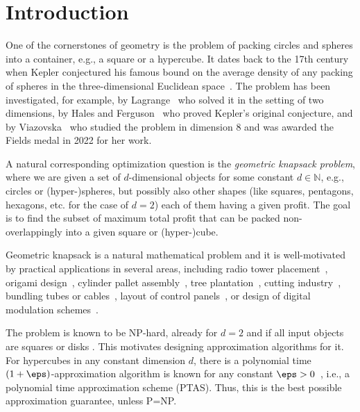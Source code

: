 

\section{Introduction}

\label{sec:intro} One of the cornerstones of geometry is the problem
of packing circles and spheres into a container, e.g., a square or
a hypercube. It dates back to the 17th century when Kepler conjectured
his famous bound on the average density of any packing of spheres
in the three-dimensional Euclidean space~\cite{kepler2010six}. The problem has been investigated, for example, by Lagrange~\cite{chang2010simple}
who solved it in the setting of two dimensions, by Hales and Ferguson~\cite{hales2006formulation}
who proved Kepler's original conjecture, and by Viazovska~\cite{viazovska2017sphere}
who studied the problem in dimension $8$ and was awarded the Fields
medal in 2022 for her work.

A natural corresponding optimization question is the \emph{geometric
knapsack problem}, where we are given a set of $d$-dimensional objects
for some constant $d\in\mathbb{N}$, e.g., circles or \mbox{(hyper-)}spheres,
but possibly also other shapes (like squares, pentagons, hexagons,
etc. for the case of $d=2$)  each of them having a given profit. The goal is to find the
subset of maximum total profit that can be packed non-overlappingly
into a given square or (hyper-)cube.  

Geometric knapsack is a natural mathematical problem and it is well-motivated
by practical applications in several areas, including radio tower
placement~\cite{szabo2007new}, origami design~\cite{lang1996computational},
cylinder pallet assembly~\cite{castillo2008solving,fraser1994integrated},
tree plantation~\cite{szabo2007new}, cutting industry~\cite{szabo2007new},
bundling tubes or cables~\cite{wang2002improved}, layout of control
panels~\cite{castillo2008solving}, or design of digital modulation
schemes~\cite{peikert1992packing}.

The problem is known to be \textsf{NP}-hard, already for $d=2$ and
if all input objects are  squares or disks \cite{demaine-Origami-NPHard,adamaszek2016hardness}.
This motivates designing approximation algorithms for it. For hypercubes
in any constant dimension $d$, there is a polynomial time $(1+\eps)$-approximation
algorithm is known for any constant $\eps>0$~\cite{Jansen0LS22}, i.e.,
a polynomial time approximation scheme (\textsf{PTAS}). Thus, this is the best
possible approximation guarantee, unless \textsf{P}=\textsf{NP}.

